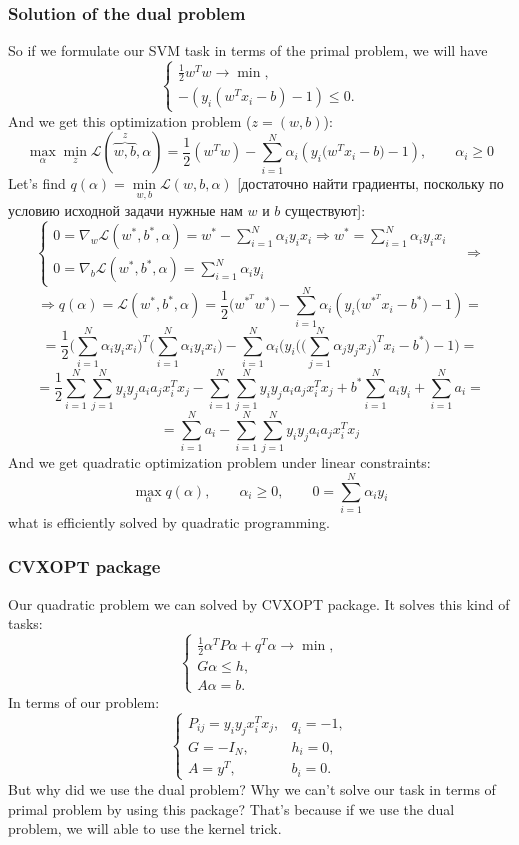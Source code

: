 \subsubsection*{Solution of the dual problem}

So if we formulate our SVM task in terms of the primal problem, we will have
$$\begin{cases}
	\frac{1}{2}w^Tw\to\min, \\
	-(y_i(w^Tx_i-b)-1)\le0.
\end{cases}$$
And we get this optimization problem ($z=(w,b)$):
$$\max\limits_{\alpha}\min\limits_{z}\mathcal{L}(\overbrace{w,b}^z,\alpha)=\frac{1}{2}(w^Tw)-\sum\limits_{i=1}^{N}\alpha_i(y_i\big(w^Tx_i-b\big)-1),\qquad\alpha_i\ge0$$
Let's find $q(\alpha)=\min\limits_{w,b}\mathcal{L}(w,b,\alpha)$ [достаточно найти градиенты, поскольку по условию исходной задачи нужные нам $w$ и $b$ существуют]:
$$\begin{cases}
	0=\nabla_w\mathcal{L}(w^*,b^*,\alpha)=w^*-\sum\limits_{i=1}^{N}\alpha_iy_ix_i\Rightarrow w^*=\sum\limits_{i=1}^{N}\alpha_iy_ix_i &  \\
	0=\nabla_b\mathcal{L}(w^*,b^*,\alpha)=\sum\limits_{i=1}^{N}\alpha_iy_i & 
\end{cases}\Longrightarrow$$
$$\Longrightarrow q(\alpha)=\mathcal{L}(w^*,b^*,\alpha)=\frac{1}{2}\big(w^{*^T}w^*\big)-\sum\limits_{i=1}^{N}\alpha_i(y_i\big(w^{*^T}x_i-b^*\big)-1)=$$
$$=\frac{1}{2}\Big(\sum\limits_{i=1}^{N}\alpha_iy_ix_i\Big)^T\Big(\sum\limits_{i=1}^{N}\alpha_iy_ix_i\Big)-\sum\limits_{i=1}^{N}\alpha_i\big(y_i\Big(\Big(\sum\limits_{j=1}^{N}\alpha_jy_jx_j\Big)^Tx_i-b^*\Big)-1\big)=$$
$$=\frac{1}{2}\sum\limits_{i=1}^{N}\sum\limits_{j=1}^{N}y_iy_ja_ia_jx_i^Tx_j-\sum\limits_{i=1}^{N}\sum\limits_{j=1}^{N}y_iy_ja_ia_jx_i^Tx_j+b^*\sum\limits_{i=1}^{N}a_iy_i+\sum\limits_{i=1}^{N}a_i=$$
$$=\sum\limits_{i=1}^{N}a_i-\sum\limits_{i=1}^{N}\sum\limits_{j=1}^{N}y_iy_ja_ia_jx_i^Tx_j$$
And we get quadratic optimization problem under linear constraints:
$$\max\limits_{\alpha}q(\alpha),\qquad\alpha_i\ge0,\qquad 0=\sum\limits_{i=1}^{N}\alpha_iy_i$$
what is efficiently solved by quadratic programming.

\subsubsection*{CVXOPT package}

Our quadratic problem we can solved by CVXOPT package. It solves this kind of tasks:
$$\begin{cases}
	\frac{1}{2}\alpha^TP\alpha+q^T\alpha\to\min,\\
	G\alpha\le h, \\
	A\alpha=b.
\end{cases}$$
In terms of our problem:
$$\begin{cases}
	P_{ij}=y_iy_jx_i^Tx_j, & q_i=-1, \\
	G=-I_N, & h_i = 0, \\
	A=y^T, & b_i = 0.
\end{cases}$$
But why did we use the dual problem? Why we can't solve our task in terms of primal problem by using this package? That's because if we use the dual problem, we will able to use the kernel trick.


